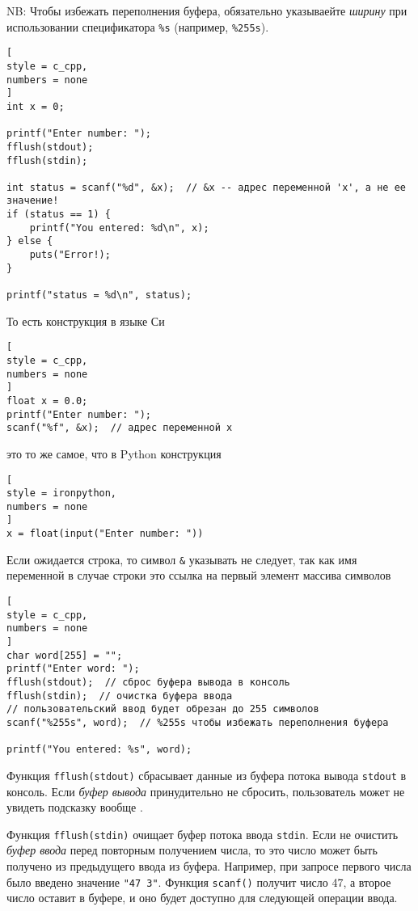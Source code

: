 \documentclass[%
	11pt,
	a4paper,
	utf8,
		]{article}
\begin{document}
NB: Чтобы избежать переполнения буфера, обязательно указываейте \emph{ширину} при использовании спецификатора \verb*|%s| (например, \verb|%255s|).

\begin{lstlisting}[
style = c_cpp,
numbers = none
]
int x = 0;

printf("Enter number: ");
fflush(stdout);
fflush(stdin);

int status = scanf("%d", &x);  // &x -- адрес переменной 'x', а не ее значение!
if (status == 1) {
    printf("You entered: %d\n", x);
} else {
    puts("Error!);
}

printf("status = %d\n", status);
\end{lstlisting}

То есть конструкция в языке Си
\begin{lstlisting}[
style = c_cpp,
numbers = none
]
float x = 0.0;
printf("Enter number: ");
scanf("%f", &x);  // адрес переменной x
\end{lstlisting}
это то же самое, что в Python конструкция
\begin{lstlisting}[
style = ironpython,
numbers = none
]
x = float(input("Enter number: "))
\end{lstlisting}

Если ожидается строка, то символ \verb*|&| указывать не следует, так как имя переменной в случае строки это ссылка на первый элемент массива символов
\begin{lstlisting}[
style = c_cpp,
numbers = none
]
char word[255] = "";
printf("Enter word: ");
fflush(stdout);  // сброс буфера вывода в консоль
fflush(stdin);  // очистка буфера ввода
// пользовательский ввод будет обрезан до 255 символов
scanf("%255s", word);  // %255s чтобы избежать переполнения буфера

printf("You entered: %s", word);
\end{lstlisting}

Функция \verb|fflush(stdout)| сбрасывает данные из буфера потока вывода \verb*|stdout| в консоль. Если \emph{буфер вывода} принудительно не сбросить, пользователь может не увидеть подсказку вообще \cite[]{prokhorenok-prog-c:2020}.

Функция \verb*|fflush(stdin)| очищает буфер потока ввода \verb|stdin|. Если не очистить \emph{буфер ввода} перед повторным получением числа, то это число может быть получено из предыдущего ввода из буфера. Например, при запросе первого числа было введено значение \verb*|"47 3"|. Функция \verb|scanf()| получит число 47, а второе число оставит в буфере, и оно будет доступно для следующей операции ввода. 
\end{document}
